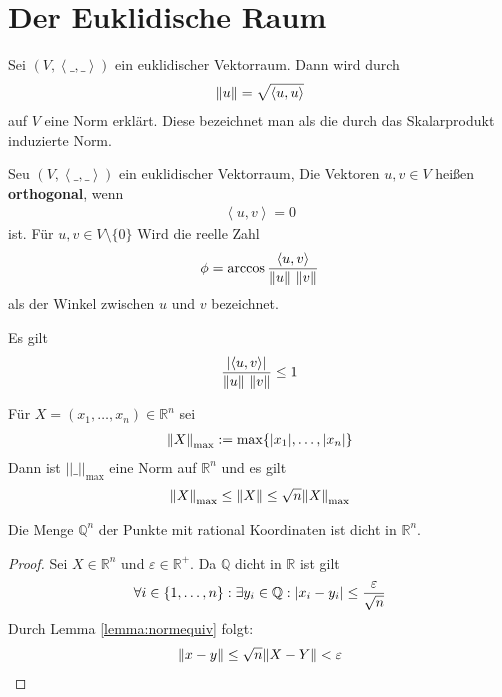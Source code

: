 \documentclass{report}
\renewcommand\epsilon{\varepsilon}
\newcommand{\tbf}[1]{\textbf{#1}}
\newcommand{\bQ}{\mathbb{Q}}
\newcommand{\bR}{\mathbb{R}}
\newcommand{\scalar}[2]{\left\langle #1, #2 \right\rangle}
\begin{document}
\chapter{Der Euklidische Raum}
\begin{lemma}
 Sei $(V, \scalar{\_}{\_})$ ein euklidischer Vektorraum. Dann wird durch
 \begin{align*}
  \norm{u} = \sqrt{\scalar{u}{u}}
 \end{align*}
auf $V$ eine Norm erklärt. Diese bezeichnet man als die durch das Skalarprodukt induzierte Norm.
\end{lemma}
\begin{definition}
 Seu $(V, \scalar{\_}{\_})$ ein euklidischer Vektorraum, Die Vektoren $u, v \in V$ heißen \tbf{orthogonal}, wenn \begin{align*}
   \scalar{u}{v} = 0                                                                                                                 
 \end{align*}
 ist. Für $u, v \in V \setminus \{0\}$ Wird die reelle Zahl
 \begin{align*}
  \phi = \arccos \frac{\scalar{u}{v}}{\norm{u}\ \norm{v}}
 \end{align*}
 als der Winkel zwischen $u$ und $v$ bezeichnet.
\end{definition}
\begin{anmerkung}
 Es gilt
 \begin{align*}
  \frac{\abs{\scalar{u}{v}}}{\norm{u}\ \norm{v}} \leq 1
 \end{align*}
\end{anmerkung}
\begin{lemma}
\label{lemma:normequiv}
 Für $X = (x_1, \hdots, x_n) \in \bR^n$ sei
 \begin{align*}
  \norm{X}_{\max} := \max\{\abs{x_1}, \hdots, \abs{x_n}\}
 \end{align*}
 Dann ist $||\_||_{\max}$ eine Norm auf $\bR^n$ und es gilt
 \begin{align*}
  \norm{X}_{\max} \leq \norm{X} \leq \sqrt{n}\norm{X}_{\max}
 \end{align*}
\end{lemma}
\begin{theorem}
Die Menge $\bQ^n$ der Punkte mit rational Koordinaten ist dicht in $\bR^n$.
\end{theorem}
\begin{proof}
Sei $X \in \bR^n$ und $\epsilon \in \bR^+$. Da $\bQ$ dicht in $\bR$ ist gilt
\begin{align*}
 \forall i \in \{1, \hdots, n\} : \exists y_i \in \bQ : \abs{x_i - y_i} \leq \frac{\epsilon}{\sqrt{n}}
\end{align*}
Durch Lemma \ref{lemma:normequiv} folgt:
\begin{align*}
 \norm{x-y} \leq \sqrt{n}\norm{X - Y} < \epsilon
\end{align*}
\end{proof}
\end{document}
